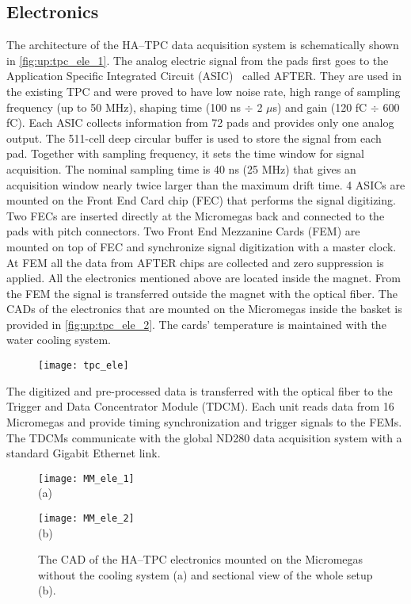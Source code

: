 \documentclass[../main.tex]{subfiles}
\begin{document}
\subsection{Electronics}
\label{sec:up:tpc_ele}
The architecture of the HA--TPC data acquisition system is schematically shown in \autoref{fig:up:tpc_ele_1}. The analog electric signal from the pads first goes to the Application Specific Integrated Circuit (ASIC)~\cite{Baron2007} called AFTER. They are used in the existing TPC and were proved to have low noise rate, high range of sampling frequency (up to 50 MHz), shaping time (100 ns $\div$ 2 $\mu$s) and gain (120 fC $\div$ 600 fC). Each ASIC collects information from 72 pads and provides only one analog output. The 511-cell deep circular buffer is used to store the signal from each pad. Together with sampling frequency, it sets the time window for signal acquisition. The nominal sampling time is 40 ns (25 MHz) that gives an acquisition window nearly twice larger than the maximum drift time. 4 ASICs are mounted on the Front End Card chip (FEC) that performs the signal digitizing. Two FECs are inserted directly at the Micromegas back and connected to the pads with pitch connectors. Two Front End Mezzanine Cards (FEM) are mounted on top of FEC and synchronize signal digitization with a master clock. At FEM all the data from AFTER chips are collected and zero suppression is applied. All the electronics mentioned above are located inside the magnet. From the FEM the signal is transferred outside the magnet with the optical fiber. The CADs of the electronics that are mounted on the Micromegas inside the basket is provided in \autoref{fig:up:tpc_ele_2}. The cards' temperature is maintained with the water cooling system.


\begin{figure}[!ht]
  \centering
  \texttt{[image: tpc\_ele]}
  \caption{}
  \label{fig:up:tpc_ele_1}
\end{figure}

The digitized and pre-processed data is transferred with the optical fiber to the Trigger and Data Concentrator Module (TDCM). Each unit reads data from 16 Micromegas and provide timing synchronization and trigger signals to the FEMs. The TDCMs communicate with the global ND280 data acquisition system with a standard Gigabit Ethernet link.

\begin{figure}[!ht]
  \centering
  \begin{minipage}{0.49\linewidth}
    \centering
    \texttt{[image: MM\_ele\_1]} \\ (a)
  \end{minipage}
  \begin{minipage}{0.49\linewidth}
    \centering
    \texttt{[image: MM\_ele\_2]} \\ (b)
  \end{minipage}
  \caption{The CAD of the HA--TPC electronics mounted on the Micromegas without the cooling system (a) and sectional view of the whole setup (b).}
  \label{fig:up:tpc_ele_2}
\end{figure}
\end{document}
